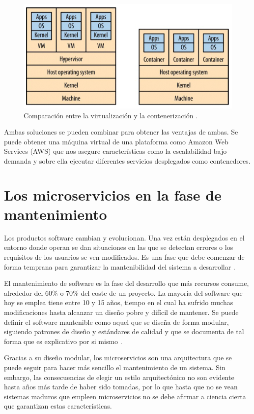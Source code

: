 \documentclass[11pt,spanish,listoffigures]{tfgetsinf}
\begin{document}
\begin{figure}[h]
\centering
\includegraphics[scale=0.8]{containers_vms}
\caption{Comparación entre la virtualización y la contenerización \cite{Newman2015a}.}
\end{figure}

Ambas soluciones se pueden combinar para obtener las ventajas de ambas. Se puede obtener una máquina virtual de una plataforma como Amazon Web Services (AWS) que nos asegure características como la escalabilidad bajo demanda y sobre ella ejecutar diferentes servicios desplegados como contenedores.

\section{Los microservicios en la fase de mantenimiento}

Los productos software cambian y evolucionan. Una vez están desplegados en el entorno donde operan se dan situaciones en las que se detectan errores o los requisitos de los usuarios se ven modificados. Es una fase que debe comenzar de forma temprana para garantizar la mantenibilidad del sistema a desarrollar \cite{Bourque2014}.

El mantenimiento de software es la fase del desarrollo que más recursos consume, alrededor del 60\% o 70\% del coste de un proyecto. La mayoría del software que hoy se emplea tiene entre 10 y 15 años, tiempo en el cual ha sufrido muchas modificaciones hasta alcanzar un diseño pobre y difícil de mantener. Se puede definir el software mantenible como aquel que se diseña de forma modular, siguiendo patrones de diseño y estándares de calidad y que se documenta de tal forma que es explicativo por si mismo \cite{Pressman}.

Gracias a su diseño modular, los microservicios son una arquitectura que se puede seguir para hacer más sencillo el mantenimiento de un sistema. Sin embargo, las consecuencias de elegir un estilo arquitectónico no son evidente hasta años más tarde de haber sido tomadas, por lo que hasta que no se vean sistemas maduros que empleen microservicios no se debe afirmar a ciencia cierta que garantizan estas características. \cite{Lewis2014}
\end{document}
